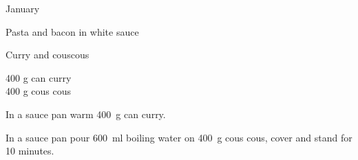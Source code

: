 \begin{menu}{January}
\begin{recipe}{2}{Pasta and bacon in white sauce}
\begin{instructions}
    \end{instructions}
    \end{recipe}%
  
    \begin{recipe}{1}{Curry and couscous}%
		\begin{ingredients}
		400 g can curry  \\
	400 g cous cous  \\
	
		\end{ingredients}
	
    \begin{instructions}
    \item 
        In a sauce pan warm
        400~g  can curry.
      \item 
      In a
      sauce pan pour 600~ml  boiling water
      on 400~g  cous cous, cover and
      stand for 10 minutes.
    
    \end{instructions}
    \end{recipe}%
  
    \clearpage
    \end{menu}
	
